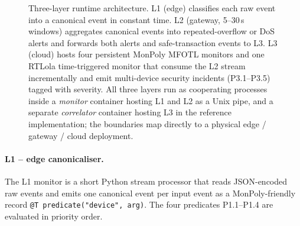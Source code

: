 \documentclass[runningheads]{llncs}
\begin{document}
\begin{figure}[t]
\centering
{}
\caption{Three-layer runtime architecture.  L1 (edge) classifies
each raw event into a canonical event in constant time.  L2
(gateway, 5--30\,s windows) aggregates canonical events into
repeated-overflow or DoS alerts and forwards both alerts and
safe-transaction events to L3.  L3 (cloud) hosts four persistent MonPoly MFOTL monitors and one RTLola time-triggered monitor that consume the L2 stream incrementally and emit multi-device security incidents (P3.1--P3.5) tagged with
severity.  All three layers run as cooperating processes inside
a \emph{monitor} container hosting L1 and L2 as a Unix pipe, and a separate \emph{correlator} container hosting L3 in the reference implementation; the
boundaries map directly to a physical edge / gateway / cloud
deployment.}
\label{fig:arch}
\end{figure}

\paragraph{L1 -- edge canonicaliser.}
The L1 monitor is a short Python stream processor that reads
JSON-encoded raw events and emits one canonical event per input
event as a MonPoly-friendly record \texttt{@T predicate("device",
arg)}.  The four predicates P1.1--P1.4 are evaluated in priority
order.
\end{document}
